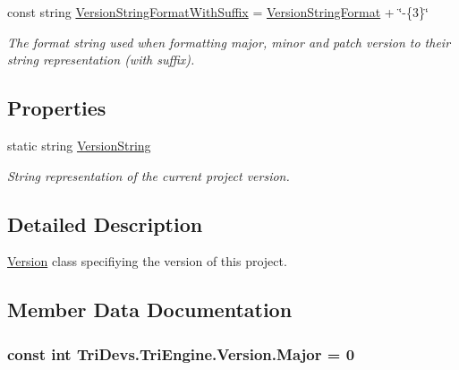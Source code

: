\begin{DoxyCompactItemize}
const string \hyperlink{class_tri_devs_1_1_tri_engine_1_1_version_a808466c057e2e39b3ef143ea1d94ec4b}{Version\-String\-Format\-With\-Suffix} = \hyperlink{class_tri_devs_1_1_tri_engine_1_1_version_adf5664e5d5b902a24c6f14b195dd6530}{Version\-String\-Format} + \char`\"{}-\/\{3\}\char`\"{}
\begin{DoxyCompactList}\small\item\em The format string used when formatting major, minor and patch version to their string representation (with suffix). \end{DoxyCompactList}\end{DoxyCompactItemize}
\subsection*{Properties}
\begin{DoxyCompactItemize}
\item 
static string \hyperlink{class_tri_devs_1_1_tri_engine_1_1_version_ac673598a246291c8d7e8741cc9657db4}{Version\-String}
\begin{DoxyCompactList}\small\item\em String representation of the current project version. \end{DoxyCompactList}\end{DoxyCompactItemize}


\subsection{Detailed Description}
\hyperlink{class_tri_devs_1_1_tri_engine_1_1_version}{Version} class specifiying the version of this project. 



\subsection{Member Data Documentation}
\hypertarget{class_tri_devs_1_1_tri_engine_1_1_version_a84694bfde22fdb60202999d7fa6fa27e}{
\subsubsection[{Major}]{\setlength{\rightskip}{0pt plus 5cm}const int Tri\-Devs.\-Tri\-Engine.\-Version.\-Major = 0}}\label{class_tri_devs_1_1_tri_engine_1_1_version_a84694bfde22fdb60202999d7fa6fa27e}


